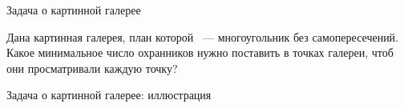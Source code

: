\documentclass[12pt,aspectratio=169,svgnames]{beamer}
\begin{document}
    \begin{frame}{Задача о картинной галерее}

        \begin{task}

            Дана картинная галерея, план которой ~--- многоугольник без самопересечений. Какое минимальное число охранников нужно поставить в точках галереи, чтоб
            они просматривали каждую точку?

        \end{task}

    \end{frame}

    \begin{frame}{Задача о картинной галерее: иллюстрация}

        \begin{center}
\end{center}
\end{frame}
\end{document}
